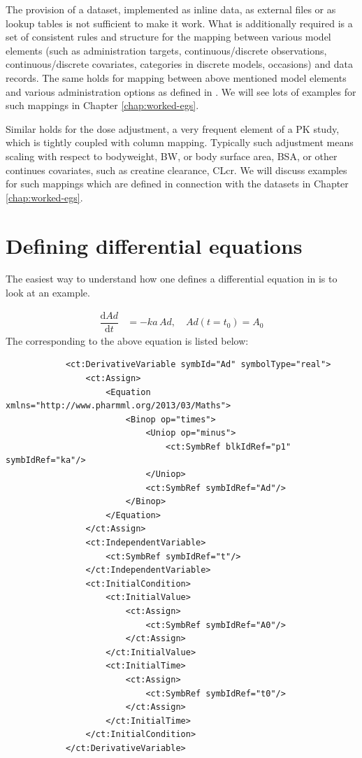 The provision of a dataset, implemented as inline data, as external files or 
as lookup tables is not sufficient to make it work. What is additionally required 
is a set of consistent rules and structure for the mapping between 
various model elements (such as administration targets, continuous/discrete 
observations, continuous/discrete covariates, categories in discrete models, 
occasions) and data records. The same holds for mapping between above 
mentioned model elements and various administration options as defined 
in . We will see lots of examples for such mappings in 
Chapter \ref{chap:worked-egs}.

Similar holds for the dose adjustment, a very frequent element of a PK study, 
which is tightly coupled with column mapping. Typically such adjustment 
means scaling with respect to bodyweight, BW, or body surface area, BSA, 
or other continues covariates, such as creatine clearance, CLcr. We will discuss 
examples for such mappings which are defined in connection with the datasets 
in Chapter \ref{chap:worked-egs}.


\section{Defining differential equations}
\label{sec:odes}

The easiest way to understand how one defines a differential equation in \pharmml
is to look at an example.

\begin{align*}
	\dfrac{\mathrm{d}\mathit{Ad}}{\mathrm{d}t}  &=  -\mathit{ka}\,  \mathit{Ad}, \quad \textit{Ad}(t=t_0)  =  A_0
\end{align*}
%
The corresponding \pharmml to the above equation is listed below:
%
\lstset{language=XML}
\begin{lstlisting}
            <ct:DerivativeVariable symbId="Ad" symbolType="real">
                <ct:Assign>
                    <Equation xmlns="http://www.pharmml.org/2013/03/Maths">
                        <Binop op="times">
                            <Uniop op="minus">
                                <ct:SymbRef blkIdRef="p1" symbIdRef="ka"/>
                            </Uniop>
                            <ct:SymbRef symbIdRef="Ad"/>
                        </Binop>
                    </Equation>
                </ct:Assign>
                <ct:IndependentVariable>
                    <ct:SymbRef symbIdRef="t"/>
                </ct:IndependentVariable>
                <ct:InitialCondition>
                    <ct:InitialValue>
                        <ct:Assign>
                            <ct:SymbRef symbIdRef="A0"/>
                        </ct:Assign>
                    </ct:InitialValue>
                    <ct:InitialTime>
                        <ct:Assign>
                            <ct:SymbRef symbIdRef="t0"/>
                        </ct:Assign>
                    </ct:InitialTime>
                </ct:InitialCondition>
            </ct:DerivativeVariable>
\end{lstlisting}


